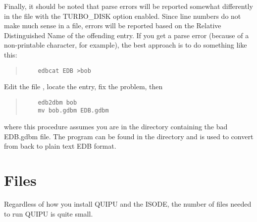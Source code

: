 Finally, it should be noted that parse errors will be reported
somewhat differently in the  file with the
TURBO\_DISK option enabled.  Since line numbers do not make much
sense in a  file, errors will be reported based on the
Relative Distinguished Name of the offending entry.  If you get
a parse error (because of a non-printable character, for example),
the best approach is to do something like this:
\begin{quote}\begin{verbatim}
	edbcat EDB >bob
\end{verbatim}\end{quote}
Edit the file , locate the entry, fix the problem, then
\begin{quote}\begin{verbatim}
	edb2dbm bob
	mv bob.gdbm EDB.gdbm
\end{verbatim}\end{quote}
where this procedure assumes you are in the directory containing
the bad EDB.gdbm file.  The  program can be found in the
 directory and is used to convert from 
back to plain text EDB format.

\section{Files}
Regardless of how you install QUIPU and the ISODE,
the number of files needed to run QUIPU is quite small.

